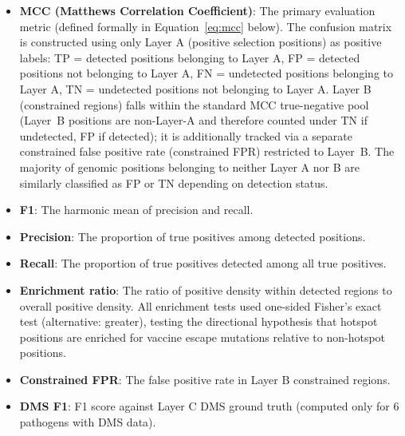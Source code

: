 \begin{itemize}
\item \textbf{MCC (Matthews Correlation Coefficient)}: The primary evaluation metric (defined formally in Equation~\ref{eq:mcc} below).
The confusion matrix is constructed using only Layer A (positive selection positions) as positive labels: TP = detected positions belonging to Layer A, FP = detected positions not belonging to Layer A, FN = undetected positions belonging to Layer A, TN = undetected positions not belonging to Layer A.
Layer B (constrained regions) falls within the standard MCC true-negative pool (Layer~B positions are non-Layer-A and therefore counted under TN if undetected, FP if detected); it is additionally tracked via a separate constrained false positive rate (constrained FPR) restricted to Layer~B. The majority of genomic positions belonging to neither Layer A nor B are similarly classified as FP or TN depending on detection status.
\item \textbf{F1}: The harmonic mean of precision and recall.
\item \textbf{Precision}: The proportion of true positives among detected positions.
\item \textbf{Recall}: The proportion of true positives detected among all true positives.
\item \textbf{Enrichment ratio}: The ratio of positive density within detected regions to overall positive density.
All enrichment tests used one-sided Fisher's exact test (alternative: greater), testing the directional hypothesis that hotspot positions are enriched for vaccine escape mutations relative to non-hotspot positions.
\item \textbf{Constrained FPR}: The false positive rate in Layer B constrained regions.
\item \textbf{DMS F1}: F1 score against Layer C DMS ground truth (computed only for 6 pathogens with DMS data).
\end{itemize}


